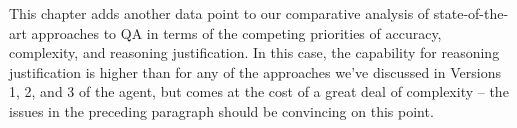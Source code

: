 This chapter adds another data point to our comparative analysis of state-of-the-art approaches to QA in terms of the competing priorities of accuracy, complexity, and reasoning justification.  In this case, the capability for reasoning justification is higher than for any of the approaches we've discussed in Versions 1, 2, and 3 of the agent, but comes at the cost of a great deal of complexity -- the issues in the preceding paragraph should be convincing on this point.




%
%
%


